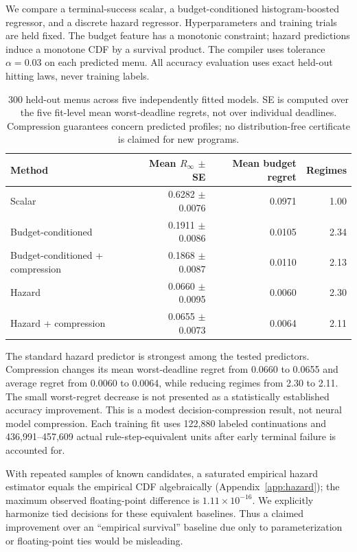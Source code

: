 \documentclass[11pt]{article}
\theoremstyle{definition}\newtheorem{definition}[theorem]{Definition}
\begin{document}
We compare a terminal-success scalar, a budget-conditioned histogram-boosted regressor, and a discrete hazard regressor. Hyperparameters and training trials are held fixed. The budget feature has a monotonic constraint; hazard predictions induce a monotone CDF by a survival product. The compiler uses tolerance $\alpha=0.03$ on each predicted menu. All accuracy evaluation uses exact held-out hitting laws, never training labels.

\begin{table}[t]
\centering\small
\begin{tabular}{lrrr}
\toprule
Method & Mean $R_\infty$ $\pm$ SE & Mean budget regret & Regimes \\
\midrule
Scalar & 0.6282 $\pm$ 0.0076 & 0.0971 & 1.00 \\
Budget-conditioned & 0.1911 $\pm$ 0.0086 & 0.0105 & 2.34 \\
Budget-conditioned + compression & 0.1868 $\pm$ 0.0087 & 0.0110 & 2.13 \\
Hazard & 0.0660 $\pm$ 0.0095 & 0.0060 & 2.30 \\
Hazard + compression & 0.0655 $\pm$ 0.0073 & 0.0064 & 2.11 \\
\bottomrule
\end{tabular}
\caption{300 held-out menus across five independently fitted models. SE is computed over the five fit-level mean worst-deadline regrets, not over individual deadlines. Compression guarantees concern predicted profiles; no distribution-free certificate is claimed for new programs.}
\label{tab:learned}
\end{table}

The standard hazard predictor is strongest among the tested predictors. Compression changes its mean worst-deadline regret from 0.0660 to 0.0655 and average regret from 0.0060 to 0.0064, while reducing regimes from 2.30 to 2.11. The small worst-regret decrease is not presented as a statistically established accuracy improvement. This is a modest decision-compression result, not neural model compression. Each training fit uses 122,880 labeled continuations and 436,991--457,609 actual rule-step-equivalent units after early terminal failure is accounted for.

With repeated samples of known candidates, a saturated empirical hazard estimator equals the empirical CDF algebraically (Appendix~\ref{app:hazard}); the maximum observed floating-point difference is $1.11\times10^{-16}$. We explicitly harmonize tied decisions for these equivalent baselines. Thus a claimed improvement over an ``empirical survival'' baseline due only to parameterization or floating-point ties would be misleading.
\end{document}
